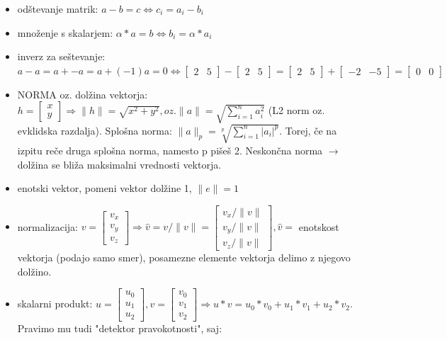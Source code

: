 \documentclass{article}
\begin{document}
\begin{itemize}
\item odštevanje matrik: $a - b = c \iff c_i = a_i - b_i$
\item množenje s skalarjem: $\alpha * a = b \iff b_i = \alpha * a_i$
\item inverz za seštevanje: $a - a = a + -a = a + (-1)a=0 \iff \begin{bmatrix} 2 & 5 \end{bmatrix} - \begin{bmatrix} 2 & 5 \end{bmatrix} = \begin{bmatrix} 2 & 5 \end{bmatrix} + \begin{bmatrix} -2 & -5 \end{bmatrix}=\begin{bmatrix} 0 & 0 \end{bmatrix}$
\item NORMA oz. dolžina vektorja: $h = \begin{bmatrix} x \\ y \end{bmatrix} \Longrightarrow \lVert h \rVert = \sqrt{x^2 + y^2}, oz. \lVert a \rVert = \sqrt{\sum_{i=1}^n a_i^2}$ (L2 norm oz. evklidska razdalja). Splošna norma: $\lVert a \rVert_p = \sqrt[p]{\sum_{i=1}^n |a_i|^p}$. Torej, če na izpitu reče druga splošna norma, namesto p pišeš 2. Neskončna norma $\to$ dolžina se bliža maksimalni vrednosti vektorja. 
\item enotski vektor, pomeni vektor dolžine 1, $\lVert e \rVert = 1$
\item normalizacija: $v = \begin{bmatrix} v_x \\ v_y \\ v_z \end{bmatrix} \Longrightarrow \hat{v} = v / \lVert v \rVert = \begin{bmatrix} v_x/\lVert v \rVert \\ v_y/\lVert v \rVert \\ v_z/\lVert v \rVert \end{bmatrix}, \hat{v} = $ enotskost vektorja (podajo samo smer), posamezne elemente vektorja delimo z njegovo dolžino.
\item skalarni produkt: $u = \begin{bmatrix} u_0 \\ u_1 \\ u_2 \end{bmatrix}, v = \begin{bmatrix} v_0 \\ v_1 \\ v_2 \end{bmatrix} \Longrightarrow u * v = u_0*v_0 + u_1*v_1 + u_2*v_2$. Pravimo mu tudi "detektor pravokotnosti", saj:

\end{itemize}
\end{document}
